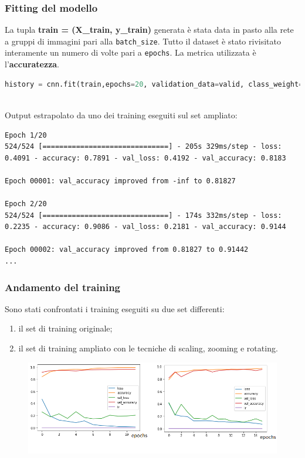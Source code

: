 \documentclass{beamer}
\begin{document}
\begin{frame}[fragile]
	\frametitle{Fitting del modello}
	La tupla \textbf{train = (X\_train, y\_train)} generata è stata data in pasto alla rete
	 a gruppi di immagini pari alla \lstinline[language = Python]{batch_size}.
	Tutto il dataset è stato rivisitato interamente un numero di volte pari a \lstinline[language = Python]{epochs}.
	La metrica utilizzata è l'\textbf{accuratezza}. %
	\begin{lstlisting}[basicstyle=\tiny, language=Python, numbers = none]
		history = cnn.fit(train,epochs=20, validation_data=valid, class_weight=cw, callbacks=callbacks_list)
		
	\end{lstlisting}
Output estrapolato da uno dei training eseguiti sul set ampliato:
\smallskip
\begin{lstlisting}[basicstyle=\tiny, numbers = none]
Epoch 1/20
524/524 [==============================] - 205s 329ms/step - loss: 0.4091 - accuracy: 0.7891 - val_loss: 0.4192 - val_accuracy: 0.8183

Epoch 00001: val_accuracy improved from -inf to 0.81827

Epoch 2/20
524/524 [==============================] - 174s 332ms/step - loss: 0.2235 - accuracy: 0.9086 - val_loss: 0.2181 - val_accuracy: 0.9144

Epoch 00002: val_accuracy improved from 0.81827 to 0.91442
...
\end{lstlisting}
\end{frame}


\begin{frame}
	\frametitle{Andamento del training}
	Sono stati confrontati i training eseguiti su due set differenti:
	\begin{enumerate}
		\item il set di training originale;
		\item il set di training ampliato con le tecniche di scaling, zooming e rotating.
	\end{enumerate}

	\begin{figure}
		\includegraphics[width=1\textwidth]{history-pneumonia-no-aug.png}
	\end{figure}

	
\end{frame}
\end{document}
